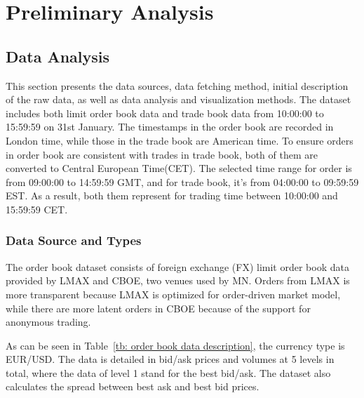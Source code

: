 \chapter{Preliminary Analysis}\label{chapter:preliminary}


\section{Data Analysis}
This section presents the data sources, data fetching method, initial description of the raw data, as well as data analysis and visualization methods. The dataset includes both limit order book data and trade book data from 10:00:00 to 15:59:59 on 31st January. The timestamps in the order book are recorded in London time, while those in the trade book are American time. To ensure orders in order book are consistent with trades in trade book, both of them are converted to Central European Time(CET). The selected time range for order is from 09:00:00 to 14:59:59 GMT, and for trade book, it's from 04:00:00 to 09:59:59 EST. As a result, both them represent for trading time between 10:00:00 and 15:59:59 CET.

\subsection{Data Source and Types}
The order book dataset consists of foreign exchange (FX) limit order book data provided by LMAX and CBOE, two venues used by MN. Orders from LMAX is more transparent because LMAX is optimized for order-driven market model, while there are more latent orders in CBOE because of the support for anonymous trading. 

As can be seen in Table~\ref{tb: order book data description}, the currency type is EUR/USD. The data is detailed in bid/ask prices and volumes at 5 levels in total, where the data of level 1 stand for the best bid/ask. The dataset also calculates the spread between best ask and best bid prices.


